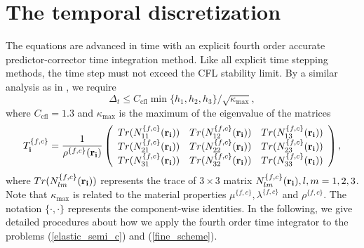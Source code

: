 \section{The temporal discretization}
The equations are advanced in time with an explicit fourth order accurate predictor-corrector time integration method. Like all explicit time stepping methods, the time step must not exceed the CFL stability limit. By a similar analysis as in \cite{sjogreen2012fourth}, we require 
\begin{equation*}
\Delta_t\leq C_{\text{cfl}}\min\{h_1,h_2,h_3\}/\sqrt{\kappa_{\max}},
\end{equation*}
where $C_{\text{cfl}} = 1.3$ and
$\kappa_{\text{max}}$ is the maximum of the eigenvalue of the matrices 
\[T_{\bf i}^{\{f,c\}} = \frac{1}{\rho^{\{f,c\}}({\bf r}_{\bf i})}\left(\begin{array}{ccc}
Tr(N_{11}^{\{f,c\}}({\bf r}_{\bf i})) &  Tr(N_{12}^{\{f,c\}}({\bf r}_{\bf i}))& Tr(N_{13}^{\{f,c\}}({\bf r}_{\bf i}))\\
Tr(N_{21}^{\{f,c\}}({\bf r}_{\bf i})) & Tr(N_{22}^{\{f,c\}}({\bf r}_{\bf i})) & Tr(N_{23}^{\{f,c\}}({\bf r}_{\bf i}))\\
Tr(N_{31}^{\{f,c\}}({\bf r}_{\bf i})) & Tr(N_{32}^{\{f,c\}}({\bf r}_{\bf i})) & Tr(N_{33}^{\{f,c\}}({\bf r}_{\bf i}))\end{array}\right), \]
where $Tr(N_{lm}^{\{f,c\}}({\bf r}_{\bf i}))$ represents the trace of $3\times3$ matrix $N_{lm}^{\{f,c\}}({\bf r}_{\bf i}),l,m = 1,2,3$. Note that $\kappa_{\text{max}}$ is related to the material properties $\mu^{\{f,c\}}, \lambda^{\{f,c\}}$ and $\rho^{\{f,c\}}$. The notation $\{\cdot,\cdot\}$ represents the component-wise identities. In the following, we give detailed procedures about how we apply the fourth order time integrator to the problems (\ref{elastic_semi_c}) and  (\ref{fine_scheme}). 

